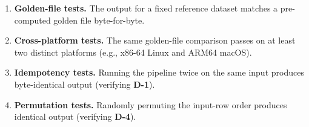 \begin{enumerate}
  \item \textbf{Golden-file tests.}  The output for a fixed reference
    dataset matches a pre-computed golden file byte-for-byte.
  \item \textbf{Cross-platform tests.}  The same golden-file comparison
    passes on at least two distinct platforms (e.g., x86-64 Linux and
    ARM64 macOS).
  \item \textbf{Idempotency tests.}  Running the pipeline twice on the same
    input produces byte-identical output (verifying \textbf{D-1}).
  \item \textbf{Permutation tests.}  Randomly permuting the input-row order
    produces identical output (verifying \textbf{D-4}).
\end{enumerate}
